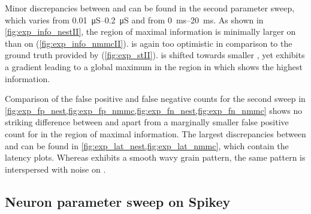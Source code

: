 Minor discrepancies between \NEST and \NMMC can be found in the second parameter sweep, which varies \wsyn from \SIrange{0.01}{0.2}{\micro\siemens} and \TauE from \SIrange{0}{20}{\milli\second}. As shown in \cref{fig:exp_info_nestII}, the region of maximal information is minimally larger on \NEST than on \mbox{\NMMC} (\cref{fig:exp_info_nmmcII}). \STII is again too optimistic in comparison to the ground truth provided by \NEST (\cref{fig:exp_stII}). \SGMO is shifted towards smaller \wsyn, yet exhibits a gradient leading to a global maximum in the region in which \NEST shows the highest information.

Comparison of the false positive and false negative counts for the second sweep in \cref{fig:exp_fp_nest,fig:exp_fp_nmmc,fig:exp_fn_nest,fig:exp_fn_nmmc} shows no striking difference between \NEST and \NMMC apart from a marginally smaller false positive count for \NEST in the region of maximal information. The largest discrepancies between \NEST and \NMMC can be found in  \cref{fig:exp_lat_nest,fig:exp_lat_nmmc}, which contain the latency plots. Whereas \NEST exhibits a smooth wavy grain pattern, the same pattern is interspersed with noise on \NMMC.

\subsection{Neuron parameter sweep on Spikey}
\label{sec:neuron_parameter_sweep_spikey}

